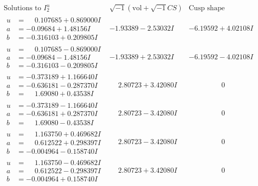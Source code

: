 \documentclass[1p]{elsarticle_modified}
\theoremstyle{definition}
\newcommand{\I}{\sqrt{-1}}
\begin{document}
$$\begin{array}{c|c|c}  
\text{Solutions to }I^u_{2}& \I (\text{vol} + \sqrt{-1}CS) & \text{Cusp shape}\\
 \hline 
\begin{aligned}
u &= \phantom{-}0.107685 + 0.869000 I \\
a &= -0.09684 + 1.48156 I \\
b &= -0.316103 + 0.209805 I\end{aligned}
 & -1.93389 - 2.53032 I & -6.19592 + 4.02108 I \\ \hline\begin{aligned}
u &= \phantom{-}0.107685 - 0.869000 I \\
a &= -0.09684 - 1.48156 I \\
b &= -0.316103 - 0.209805 I\end{aligned}
 & -1.93389 + 2.53032 I & -6.19592 - 4.02108 I \\ \hline\begin{aligned}
u &= -0.373189 + 1.166640 I \\
a &= -0.636181 - 0.287370 I \\
b &= \phantom{-}1.69080 + 0.43538 I\end{aligned}
 & \phantom{-}2.80723 + 3.42080 I & \phantom{-0.000000 } 0 \\ \hline\begin{aligned}
u &= -0.373189 - 1.166640 I \\
a &= -0.636181 + 0.287370 I \\
b &= \phantom{-}1.69080 - 0.43538 I\end{aligned}
 & \phantom{-}2.80723 - 3.42080 I & \phantom{-0.000000 } 0 \\ \hline\begin{aligned}
u &= \phantom{-}1.163750 + 0.469682 I \\
a &= \phantom{-}0.612522 + 0.298397 I \\
b &= -0.004964 - 0.158740 I\end{aligned}
 & \phantom{-}2.80723 - 3.42080 I & \phantom{-0.000000 } 0 \\ \hline\begin{aligned}
u &= \phantom{-}1.163750 - 0.469682 I \\
a &= \phantom{-}0.612522 - 0.298397 I \\
b &= -0.004964 + 0.158740 I\end{aligned}
 & \phantom{-}2.80723 + 3.42080 I & \phantom{-0.000000 } 0 \\ \hline\begin{aligned}

\end{aligned}
\end{array}$$
\end{document}
